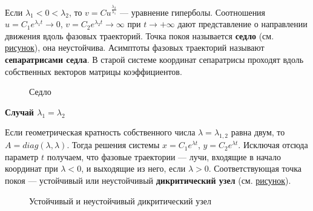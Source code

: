 Если $\lambda_1 < 0 < \lambda_2$, то $v = Cu^{\frac{\lambda_2}{\lambda_1}}$ --- уравнение гиперболы. Соотношения $u = C_1e^{\lambda_1 t} \to 0$, $v = C_2e^{\lambda_2 t} \to \infty$ при $t \to +\infty$ дают представление о направлении движения вдоль фазовых траекторий. Точка покоя называется \textbf{седло} (см. \hyperref[sedlo]{рисунок}), она неустойчива. Асимптоты фазовых траекторий называют \textbf{сепаратрисами седла}. В старой системе координат сепаратрисы проходят вдоль собственных векторов матрицы коэффициентов.

\begin{figure}[H]\label{sedlo}
    \caption{Седло}
\end{figure}

\noindent \textbf{Случай $\lambda_1 = \lambda_2$}

Если геометрическая кратность собственного числа $\lambda = \lambda_{1,2}$ равна двум, то $A = diag(\lambda, \lambda)$. Тогда решения системы $x = C_1e^{\lambda t}$, $y = C_2e^{\lambda t}$. Исключая отсюда параметр $t$ получаем, что фазовые траектории --- лучи, входящие в начало координат при $\lambda < 0$, и выходящие из него, если $\lambda > 0$. Соответствующая точка покоя --- устойчивый или неустойчивый \textbf{дикритический узел} (см. \hyperref[dikrit]{рисунок}).

\begin{figure}[H]\label{dikrit}
    \caption{Устойчивый и неустойчивый дикритический узел}
\end{figure}

